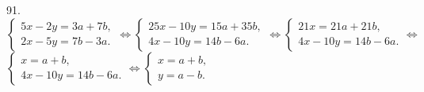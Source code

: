 91. $\begin{cases}5x-2y=3a+7b,\\ 2x-5y=7b-3a. \end{cases}\Leftrightarrow
\begin{cases}25x-10y=15a+35b,\\ 4x-10y=14b-6a. \end{cases}\Leftrightarrow
\begin{cases}21x=21a+21b,\\ 4x-10y=14b-6a. \end{cases}\Leftrightarrow$\\$
\begin{cases}x=a+b,\\ 4x-10y=14b-6a. \end{cases}\Leftrightarrow
\begin{cases}x=a+b,\\ y=a-b. \end{cases}$\\
